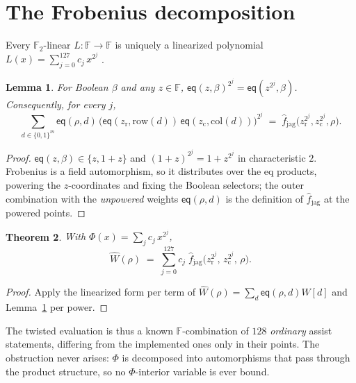\documentclass[11pt]{article}
\newcommand{\F}{\mathbb{F}}
\newcommand{\Ftwo}{\F_2}
\newcommand{\eq}{\mathsf{eq}}
\newcommand{\rowof}{\mathrm{row}}
\newcommand{\colof}{\mathrm{col}}
\newcommand{\fjag}{\hat f_{\mathrm{jag}}}
\newtheorem{theorem}{Theorem}
\newtheorem{lemma}[theorem]{Lemma}
\begin{document}
\section{The Frobenius decomposition}\label{sec:frobenius}

Every $\Ftwo$-linear $L : \F \to \F$ is uniquely a linearized
polynomial $L(x) = \sum_{j=0}^{127} c_j\, x^{2^j}$ \cite{ore,lidl}.

\begin{lemma}\label{lem:transport}
For Boolean $\beta$ and any $z \in \F$,
$\eq(z, \beta)^{2^j} = \eq(z^{2^j}, \beta)$. Consequently, for every
$j$,
\[
  \sum_{d \in \{0,1\}^m} \eq(\rho, d)\,
  \bigl(\eq(z_{\mathrm r}, \rowof(d))\,\eq(z_{\mathrm c}, \colof(d))\bigr)^{2^j}
  \;=\;
  \fjag\bigl(z_{\mathrm r}^{2^j}, z_{\mathrm c}^{2^j}, \rho\bigr).
\]
\end{lemma}

\begin{proof}
$\eq(z,\beta) \in \{z, 1{+}z\}$ and $(1{+}z)^{2^j} = 1 + z^{2^j}$ in
characteristic $2$. Frobenius is a field automorphism, so it
distributes over the eq products, powering the $z$-coordinates and
fixing the Boolean selectors; the outer combination with the
\emph{unpowered} weights $\eq(\rho, d)$ is the definition of $\fjag$
at the powered points.
\end{proof}

\begin{theorem}\label{thm:main}
With $\Phi(x) = \sum_j c_j\, x^{2^j}$,
\[
  \widehat W(\rho)
  \;=\;
  \sum_{j=0}^{127} c_j\;
  \fjag\bigl(z_{\mathrm r}^{2^j},\, z_{\mathrm c}^{2^j},\, \rho\bigr).
\]
\end{theorem}

\begin{proof}
Apply the linearized form per term of $\widehat W(\rho) = \sum_d
\eq(\rho,d) W[d]$ and Lemma~\ref{lem:transport} per power.
\end{proof}

The twisted evaluation is thus a known $\F$-combination of $128$
\emph{ordinary} assist statements, differing from the implemented ones
only in their points. The obstruction never
arises: $\Phi$ is decomposed into automorphisms that pass through the
product structure, so no $\Phi$-interior variable is ever bound.
\end{document}
